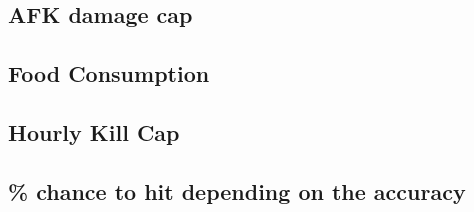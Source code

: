         \subsection{AFK damage cap}
        \subsection{Food Consumption}
        \subsection{Hourly Kill Cap}

        \subsection{\% chance to hit depending on the accuracy}
